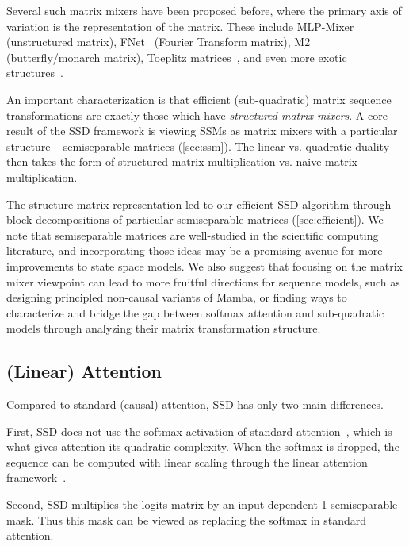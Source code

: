 Several such matrix mixers have been proposed before, where the primary axis of variation is the representation of the matrix.
These include MLP-Mixer~\citep{tolstikhin2021mlp} (unstructured matrix), FNet~\citep{lee2021fnet} (Fourier Transform matrix), M2~\citep{dao2019learning,dao2020kaleidoscope,dao2022monarch,fu2024monarch} (butterfly/monarch matrix),
Toeplitz matrices~\citep{poli2023hyena,qin2023toeplitz}, and even more exotic structures~\citep{de2018two,thomas2018learning}.

An important characterization is that efficient (sub-quadratic) matrix sequence transformations are exactly those which have \emph{structured matrix mixers}.
A core result of the SSD framework is viewing SSMs as matrix mixers with a particular structure -- semiseparable matrices (\cref{sec:ssm}).
The linear vs. quadratic duality then takes the form of structured matrix multiplication vs. naive matrix multiplication.

The structure matrix representation led to our efficient SSD algorithm through block decompositions of particular semiseparable matrices (\cref{sec:efficient}).
We note that semiseparable matrices are well-studied in the scientific computing literature, and incorporating those ideas may be a promising avenue for more improvements to state space models.
We also suggest that focusing on the matrix mixer viewpoint can lead to more fruitful directions for sequence models,
such as designing principled non-causal variants of Mamba, or finding ways to characterize and bridge the gap between softmax attention and sub-quadratic models through analyzing their matrix transformation structure.

%




\subsection{(Linear) Attention}
\label{sec:related:attention}

Compared to standard (causal) attention, SSD has only two main differences.


First, SSD does not use the softmax activation of standard attention~\citep{bahdanau2015neural,vaswani2017attention}, which is what gives attention its quadratic complexity.
When the softmax is dropped, the sequence can be computed with linear scaling through the linear attention framework~\citep{katharopoulos2020transformers}.

Second, SSD multiplies the logits matrix by an input-dependent 1-semiseparable mask.
Thus this mask can be viewed as replacing the softmax in standard attention.

